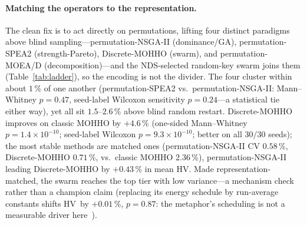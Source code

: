 \documentclass[runningheads]{llncs}
\newcommand{\HV}{\textsf{HV}}
\begin{document}
\paragraph{Matching the operators to the representation.}
The clean fix is to act directly on permutations, lifting four distinct paradigms above blind sampling---permutation-NSGA-II (dominance/GA), permutation-SPEA2 (strength-Pareto), Discrete-MOHHO (swarm), and permutation-MOEA/D (decomposition)---and the NDS-selected random-key swarm joins them (Table~\ref{tab:ladder}), so the encoding is not the divider. The four cluster within about $1\,\%$ of one another (permutation-SPEA2 vs.\ permutation-NSGA-II: Mann--Whitney $p=0.47$, seed-label Wilcoxon sensitivity $p=0.24$---a statistical tie either way), yet all sit $1.5$--$2.6\,\%$ above blind random restart. Discrete-MOHHO improves on classic MOHHO by $+4.6\,\%$ (one-sided Mann--Whitney $p=1.4\times10^{-10}$; seed-label Wilcoxon $p=9.3\times10^{-10}$; better on all $30/30$ seeds); the most stable methods are matched ones (permutation-NSGA-II CV $0.58\,\%$, Discrete-MOHHO $0.71\,\%$, vs.\ classic MOHHO $2.36\,\%$), permutation-NSGA-II leading Discrete-MOHHO by $+0.43\,\%$ in mean \HV. Made representation-matched, the swarm reaches the top tier with low variance---a mechanism check rather than a champion claim (replacing its energy schedule by run-average constants shifts \HV\ by $+0.01\,\%$, $p=0.87$: the metaphor's scheduling is not a measurable driver here~\cite{aranha,sorensen}).
\end{document}
